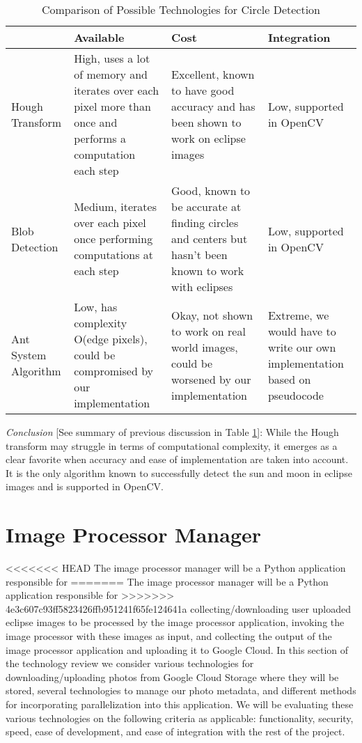 \documentclass[10pt, onecolumn, draftclsnofoot, letterpaper, compsoc]{IEEEtran}
\begin{document}
\begin{table}[h]
\centering
\caption{Comparison of Possible Technologies for Circle Detection}
\begin{tabular}{|p{3.15cm}|p{3.15cm}|p{3.15cm}|p{3.15cm}|}
\cline{4-4}

\hline  & Available & Cost & Integration \\ \hline

Hough Transform & High, uses a lot of memory and iterates over each pixel more
than once and performs a computation each step & Excellent, known to have good
accuracy and has been shown to work on eclipse images & Low, supported in OpenCV
\\ \hline

Blob Detection & Medium, iterates over each pixel once performing computations
at each step & Good, known to be accurate at finding circles and centers but
hasn’t been known to work with eclipses & Low, supported in OpenCV \\ \hline


Ant System Algorithm & Low, has complexity O(edge pixels), could be compromised
by our implementation & Okay, not shown to work on real world images, could be
worsened by our implementation & Extreme, we would have to write our own
implementation based on pseudocode \\ \hline

\end{tabular}
\label{table:george3}
\end{table}

\textit{Conclusion} [See summary of previous discussion in Table
\ref{table:george3}]: While the Hough transform may struggle in terms of computational
complexity, it emerges as a clear favorite when accuracy and ease of
implementation are taken into account. It is the only algorithm known to
successfully detect the sun and moon in eclipse images and is supported in
OpenCV.

\section{Image Processor Manager}

<<<<<<< HEAD
The image processor manager will be a Python application responsible for
=======
The image processor manager will be a Python application responsible for
>>>>>>> 4e3c607c93ff5823426ffb951241f65fe124641a
collecting/downloading user uploaded eclipse images to be processed by the image
processor application, invoking the image processor with these images as input,
and collecting the output of the image processor application and uploading it
to Google Cloud. In this section of the technology review we consider various
technologies for downloading/uploading photos from Google Cloud Storage where
they will be stored, several technologies to manage our photo metadata, and
different methods for incorporating parallelization into this application. We will
be evaluating these various technologies on the following criteria as applicable:
functionality, security, speed, ease of development, and ease of integration with
the rest of the project. \\
\end{document}
